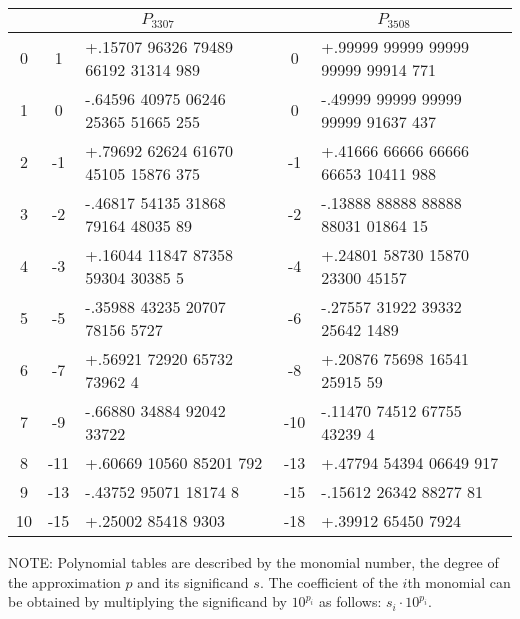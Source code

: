 \begin{center}
\begin{tabular}{|c||c|l||c|l|}
\hline
& \multicolumn{2}{c||}{$P_{3307}$} & \multicolumn{2}{c|}{$P_{3508}$}  \\
\hline
0  &   1  & +.15707 96326 79489 66192 31314 989 &   0 & +.99999 99999 99999 99999 99914 771 \\
1  &   0  & -.64596 40975 06246 25365 51665 255 &   0 & -.49999 99999 99999 99999 91637 437 \\
2  &  -1  & +.79692 62624 61670 45105 15876 375	&  -1 & +.41666 66666 66666 66653 10411 988 \\
3  &  -2  & -.46817 54135 31868 79164 48035 89  &  -2 & -.13888 88888 88888 88031 01864 15 \\
4  &  -3  & +.16044 11847 87358 59304 30385 5	&  -4 & +.24801 58730 15870 23300 45157 \\
5  &  -5  & -.35988 43235 20707 78156 5727	&  -6 & -.27557 31922 39332 25642 1489 \\
6  &  -7  & +.56921 72920 65732 73962 4		&  -8 & +.20876 75698 16541 25915 59 \\
7  &  -9  & -.66880 34884 92042 33722		& -10 & -.11470 74512 67755 43239 4 \\
8  & -11  & +.60669 10560 85201 792		& -13 & +.47794 54394 06649 917 \\
9  & -13  & -.43752 95071 18174 8		& -15 & -.15612 26342 88277 81 \\
10 & -15  & +.25002 85418 9303			& -18 & +.39912 65450 7924 \\
\hline
\end{tabular}
\end{center}
NOTE: Polynomial tables are described by the monomial number, the degree of the approximation $p$ and its significand $s$. The coefficient of the $i$th monomial can be obtained by multiplying the significand by $10^{p_{i}}$ as follows: $s_{i} \cdot 10^{p_{i}}$.

